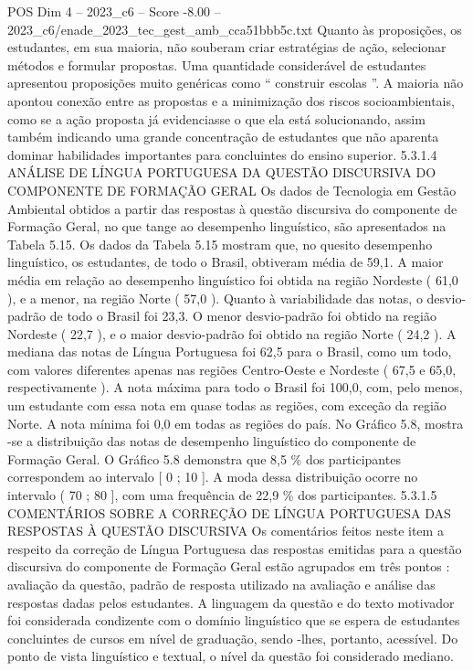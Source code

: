 \begin{textsample}{POS Dim 4 – 2023\_c6 – Score -8.00 – 2023\_c6/enade\_2023\_tec\_gest\_amb\_cca51bbb5c.txt}
Quanto às proposições, os estudantes, em sua maioria, não souberam criar estratégias de ação, selecionar métodos e formular propostas.
Uma quantidade considerável de estudantes apresentou proposições muito genéricas como “ construir escolas ”.
A maioria não apontou conexão entre as propostas e a minimização dos riscos socioambientais, como se a ação proposta já evidenciasse o que ela está solucionando, assim também indicando uma grande concentração de estudantes que não aparenta dominar habilidades importantes para concluintes do ensino superior. 5.3.1.4 ANÁLISE DE LÍNGUA PORTUGUESA DA QUESTÃO DISCURSIVA DO COMPONENTE DE FORMAÇÃO GERAL Os dados de Tecnologia em Gestão Ambiental obtidos a partir das respostas à questão discursiva do componente de Formação Geral, no que tange ao desempenho linguístico, são apresentados na Tabela 5.15.
Os dados da Tabela 5.15 mostram que, no quesito desempenho linguístico, os estudantes, de todo o Brasil, obtiveram média de 59,1.
A maior média em relação ao desempenho linguístico foi obtida na região Nordeste ( 61,0 ), e a menor, na região Norte ( 57,0 ).
Quanto à variabilidade das notas, o desvio-padrão de todo o Brasil foi 23,3.
O menor desvio-padrão foi obtido na região Nordeste ( 22,7 ), e o maior desvio-padrão foi obtido na região Norte ( 24,2 ).
A mediana das notas de Língua Portuguesa foi 62,5 para o Brasil, como um todo, com valores diferentes apenas nas regiões Centro-Oeste e Nordeste ( 67,5 e 65,0, respectivamente ).
A nota máxima para todo o Brasil foi 100,0, com, pelo menos, um estudante com essa nota em quase todas as regiões, com exceção da região Norte.
A nota mínima foi 0,0 em todas as regiões do país.
No Gráfico 5.8, mostra -se a distribuição das notas de desempenho linguístico do componente de Formação Geral.
O Gráfico 5.8 demonstra que 8,5 \% dos participantes correspondem ao intervalo [ 0 ; 10 ].
A moda dessa distribuição ocorre no intervalo ( 70 ; 80 ], com uma frequência de 22,9 \% dos participantes. 5.3.1.5 COMENTÁRIOS SOBRE A CORREÇÃO DE LÍNGUA PORTUGUESA DAS RESPOSTAS À QUESTÃO DISCURSIVA Os comentários feitos neste item a respeito da correção de Língua Portuguesa das respostas emitidas para a questão discursiva do componente de Formação Geral estão agrupados em três pontos : avaliação da questão, padrão de resposta utilizado na avaliação e análise das respostas dadas pelos estudantes.
A linguagem da questão e do texto motivador foi considerada condizente com o domínio linguístico que se espera de estudantes concluintes de cursos em nível de graduação, sendo -lhes, portanto, acessível.
Do ponto de vista linguístico e textual, o nível da questão foi considerado mediano.

\end{textsample}

